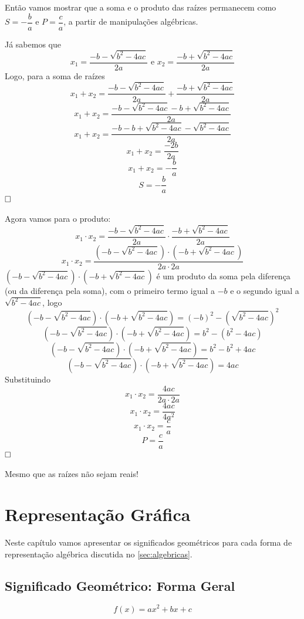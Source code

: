 \documentclass[12pt,a4paper]{report}
\begin{document}
Então vamos mostrar que a soma e o produto das raízes permanecem como $S = - \dfrac{b}{a}$ e $P = \dfrac{c}{a}$, a partir de manipulações algébricas.


Já sabemos que
$$x_1  = \frac{-b - \sqrt{b^2 - 4ac}}{2a} \text{ e } x_2  = \frac{-b + \sqrt{b^2 - 4ac}}{2a}$$
Logo, para a soma de raízes
$$x_1 + x_2 = \frac{-b - \sqrt{b^2 - 4ac}}{2a} + \frac{-b + \sqrt{b^2 - 4ac}}{2a}$$
$$x_1 + x_2 = \frac{-b - \sqrt{b^2 - 4ac}-b + \sqrt{b^2 - 4ac}}{2a}$$
$$x_1 + x_2 = \frac{-b -b + \sqrt{b^2 - 4ac}- \sqrt{b^2 - 4ac}}{2a}$$
$$x_1 + x_2 = \frac{-2b}{2a}$$
$$x_1 + x_2 = -\frac{b}{a}$$
$$S=-\frac{b}{a}$$
$\hfill \square$

Agora vamos para o produto:
$$x_1 \cdot x_2 = \frac{-b - \sqrt{b^2 - 4ac}}{2a} \cdot \frac{-b + \sqrt{b^2 - 4ac}}{2a}$$
$$x_1 \cdot x_2 = \frac{(-b - \sqrt{b^2 - 4ac}) \cdot (-b + \sqrt{b^2 - 4ac})}{2a \cdot 2a}$$
$(-b - \sqrt{b^2 - 4ac}) \cdot (-b + \sqrt{b^2 - 4ac})$ é um produto da soma pela diferença (ou da diferença pela soma), com o primeiro termo igual a $-b$ e o segundo igual a $ \sqrt{b^2 - 4ac}$, logo
$$(-b - \sqrt{b^2 - 4ac}) \cdot (-b + \sqrt{b^2 - 4ac})=(-b)^2-\left( \sqrt{b^2 - 4ac}\right)^2$$
$$(-b - \sqrt{b^2 - 4ac}) \cdot (-b + \sqrt{b^2 - 4ac})=b^2-\left( b^2 - 4ac\right)$$
$$(-b - \sqrt{b^2 - 4ac}) \cdot (-b + \sqrt{b^2 - 4ac})=b^2- b^2 + 4ac$$
$$(-b - \sqrt{b^2 - 4ac}) \cdot (-b + \sqrt{b^2 - 4ac})=4ac$$
Substituindo
$$x_1 \cdot x_2 = \frac{4ac}{2a \cdot 2a}$$
$$x_1 \cdot x_2 = \frac{4ac}{4a^2}$$
$$x_1 \cdot x_2 = \frac{c}{a}$$
$$P = \frac{c}{a}$$
$\hfill \square$

Mesmo que as raízes não sejam reais!

\chapter{Representação Gráfica}
\label{sec:grafico}

Neste capítulo vamos apresentar os significados geométricos para cada forma de representação algébrica discutida no \autoref{sec:algebricas}.
		
\section{Significado Geométrico: Forma Geral}
\label{subsec:geo_geral}

$$f(x) = ax^2 + bx + c$$ 
\end{document}
